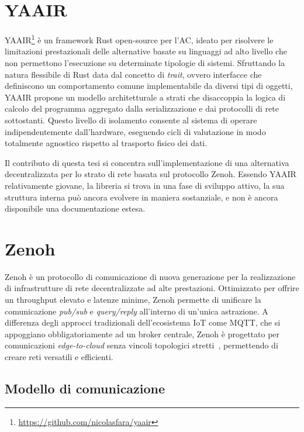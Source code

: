 \section{YAAIR}
\label{sec:yaair}

\ac{YAAIR}\footnote{\url{https://github.com/nicolasfara/yaair}} è un framework Rust
open-source per l'\ac{AC}, ideato per risolvere le limitazioni prestazionali
delle alternative basate su linguaggi ad alto livello che non permettono l'esecuzione
su determinate tipologie di sistemi.
Sfruttando la natura flessibile di Rust data dal concetto di \emph{trait}, ovvero
interfacce che definiscono un comportamento comune implementabile da diversi tipi
di oggetti, \ac{YAAIR} propone un modello architetturale a strati che disaccoppia
la logica di calcolo del programma aggregato dalla serializzazione e dai protocolli
di rete sottostanti. Questo livello di isolamento consente al sistema di operare indipendentemente
dall'hardware, eseguendo cicli di valutazione in modo totalmente agnostico rispetto
al trasporto fisico dei dati.

Il contributo di questa tesi si concentra sull'implementazione di una alternativa
decentralizzata per lo strato di rete basata sul protocollo Zenoh.
Essendo \ac{YAAIR} relativamente giovane, la libreria si trova in una fase di sviluppo attivo,
la sua struttura interna può ancora evolvere in maniera sostanziale, e non è ancora
disponibile una documentazione estesa.

\section{Zenoh}
\label{sec:zenoh}

Zenoh è un protocollo di comunicazione di nuova generazione per la realizzazione di infrastrutture
di rete decentralizzate ad alte prestazioni.
Ottimizzato per offrire un throughput elevato e latenze minime, Zenoh permette di
unificare la comunicazione \emph{pub/sub} e \emph{query/reply} all'interno di un'unica
astrazione.
A differenza degli approcci tradizionali dell'ecosistema \ac{IoT} come \ac{MQTT},
che si appoggiano obbligatoriamente ad un broker centrale, Zenoh è progettato per
comunicazioni \emph{edge-to-cloud} senza vincoli topologici stretti~\cite{zenoh:what-is-zenoh},
permettendo di creare reti versatili e efficienti.

\subsection{Modello di comunicazione}
\label{ssec:zenoh-communication-model}

